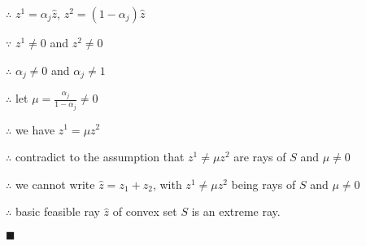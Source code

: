 $\therefore$ $z^1=\alpha_j\widehat{z}$, $z^2=(1-\alpha_j)\widehat{z}$

$\because$ $z^1\neq0$ and $z^2\neq0$

$\therefore$ $\alpha_j\neq0$ and $\alpha_j\neq1$

$\therefore$ let $\mu=\frac{\alpha_j}{1-\alpha_j}\neq0$

$\therefore$ we have $z^1=\mu z^2$

$\therefore$ contradict to the assumption that $z^1\neq\mu z^2$ are rays of $S$ and $\mu\neq0$

$\therefore$ we cannot write $\widehat{z}=z_1+z_2$, with $z^1\neq\mu z^2$ being rays of $S$ and $\mu\neq0$

$\therefore$ basic feasible ray $\widehat{z}$ of convex set $S$ is an extreme ray.
\begin{flushright} $\blacksquare$ \end{flushright}